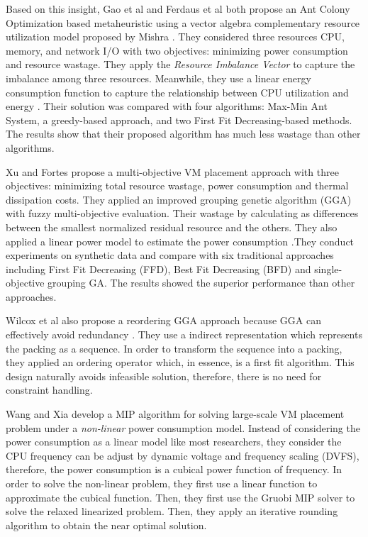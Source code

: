 Based on this insight, Gao et al \cite{Gao:2013gg} and Ferdaus et al \cite{Ferdaus:2014ep} both propose an Ant Colony Optimization based metaheuristic using a vector algebra complementary resource utilization model proposed by Mishra \cite{Mishra:2011bz}. They considered three resources CPU, memory, and network I/O with two objectives: minimizing power consumption and resource wastage. They apply the \emph{Resource Imbalance Vector} to capture the imbalance among three resources. Meanwhile, they use a linear energy consumption function to capture the relationship between CPU utilization and energy \cite{Fan:2007jr}. Their solution was compared with four algorithms: Max-Min Ant System, a greedy-based approach, and two First Fit Decreasing-based methods. The results show that their proposed algorithm has much less wastage than other algorithms.

Xu and Fortes \cite{Xu:2010vh} propose a multi-objective VM placement approach with three objectives: minimizing total resource wastage, power consumption and thermal dissipation costs. They applied an improved grouping genetic algorithm (GGA) with fuzzy multi-objective evaluation. Their wastage by calculating as differences between the smallest normalized residual resource and the others. They also applied a linear power model to estimate the power consumption \cite{Lien:2007it}.They conduct experiments on synthetic data and compare with six traditional approaches including First Fit Decreasing (FFD), Best Fit Decreasing (BFD) and single-objective grouping GA. The results showed the superior performance than other approaches. 

 Wilcox et al \cite{Wilcox:2011ea} also propose a reordering GGA approach because GGA can effectively avoid redundancy \cite{Falkenauer:1996hv}. They use a indirect representation \cite{Radcliffe:1991tp} which represents the packing as a sequence. In order to transform the sequence into a packing, they applied an ordering operator which, in essence, is a first fit algorithm. This design naturally avoids infeasible solution, therefore, there is no need for constraint handling. 

 Wang and Xia \cite{Wang:2016eha} develop a MIP algorithm for solving large-scale VM placement problem under a \emph{non-linear} power consumption model.  Instead of considering the power consumption as a linear model like most researchers, they consider the CPU frequency can be adjust by dynamic voltage and frequency scaling (DVFS), therefore, the power consumption is a cubical power function of frequency. In order to solve the non-linear problem, they first use a linear function to approximate the cubical function. Then, they first use the Gruobi MIP solver to solve the relaxed linearized problem. Then, they apply an iterative rounding algorithm to obtain the near optimal solution.   

